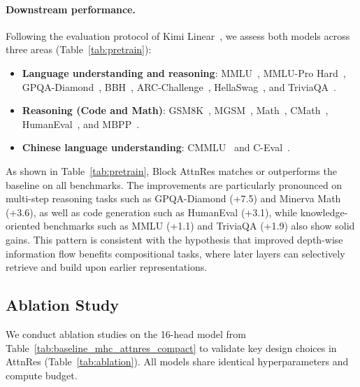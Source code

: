 

\paragraph{Downstream performance.}
Following the evaluation protocol of Kimi Linear~\cite{zhang2025kimi}, we assess both models across three areas (Table~\ref{tab:pretrain}):
\begin{itemize}[leftmargin=*]
    \item \textbf{Language understanding and reasoning}: MMLU~\cite{hendrycks-2021-mmlu}, MMLU-Pro Hard~\cite{wang2024mmlu}, GPQA-Diamond~\cite{rein2024gpqa}, BBH~\cite{suzgun2022challenging}, ARC-Challenge~\cite{clark-2018-arc}, HellaSwag~\cite{zellers-2019-hellaswag}, and TriviaQA~\cite{joshi2017triviaqa}.
    \item \textbf{Reasoning (Code and Math)}: GSM8K~\cite{gsm8k}, MGSM~\cite{mgsm}, Math~\cite{minervamath}, CMath~\cite{cmathbmk}, HumanEval~\cite{chen2021evaluatinglargelanguagemodels}, and MBPP~\cite{austin2021programsynthesislargelanguage}.
    \item \textbf{Chinese language understanding}: CMMLU~\cite{li-etal-2024-cmmlu} and C-Eval~\cite{huang2023c}.
\end{itemize}
As shown in Table~\ref{tab:pretrain}, Block AttnRes matches or outperforms the baseline on all benchmarks. The improvements are particularly pronounced on multi-step reasoning tasks such as GPQA-Diamond (+7.5) and Minerva Math (+3.6), as well as code generation such as HumanEval (+3.1), while knowledge-oriented benchmarks such as MMLU (+1.1) and TriviaQA (+1.9) also show solid gains. This pattern is consistent with the hypothesis that improved depth-wise information flow benefits compositional tasks, where later layers can selectively retrieve and build upon earlier representations.

\subsection{Ablation Study}

We conduct ablation studies on the 16-head model from Table~\ref{tab:baseline_mhc_attnres_compact} to validate key design choices in AttnRes (Table~\ref{tab:ablation}). All models share identical hyperparameters and compute budget.

